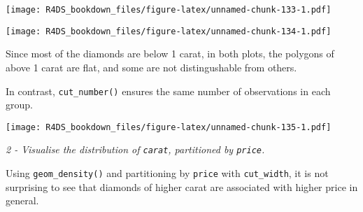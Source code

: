 \documentclass[]{article}
\newenvironment{Shaded}{\begin{snugshade}}{\end{snugshade}}
\newcommand{\KeywordTok}[1]{\textcolor[rgb]{0.13,0.29,0.53}{\textbf{#1}}}
\newcommand{\DataTypeTok}[1]{\textcolor[rgb]{0.13,0.29,0.53}{#1}}
\newcommand{\DecValTok}[1]{\textcolor[rgb]{0.00,0.00,0.81}{#1}}
\newcommand{\StringTok}[1]{\textcolor[rgb]{0.31,0.60,0.02}{#1}}
\newcommand{\OperatorTok}[1]{\textcolor[rgb]{0.81,0.36,0.00}{\textbf{#1}}}
\newcommand{\NormalTok}[1]{#1}
\theoremstyle{definition}
\theoremstyle{definition}
\theoremstyle{definition}
\theoremstyle{remark}
\begin{document}
\texttt{[image: R4DS\_bookdown\_files/figure-latex/unnamed-chunk-133-1.pdf]}

\begin{Shaded}
\end{Shaded}

\texttt{[image: R4DS\_bookdown\_files/figure-latex/unnamed-chunk-134-1.pdf]}

Since most of the diamonds are below 1 carat, in both plots, the
polygons of above 1 carat are flat, and some are not distingushable from
others.

In contrast, \texttt{cut\_number()} ensures the same number of
observations in each group.

\begin{Shaded}
\end{Shaded}

\texttt{[image: R4DS\_bookdown\_files/figure-latex/unnamed-chunk-135-1.pdf]}

\emph{2 - Visualise the distribution of \texttt{carat}, partitioned by
\texttt{price}.}

Using \texttt{geom\_density()} and partitioning by \texttt{price} with
\texttt{cut\_width}, it is not surprising to see that diamonds of higher
carat are associated with higher price in general.

\begin{Shaded}
\end{Shaded}
\end{document}
